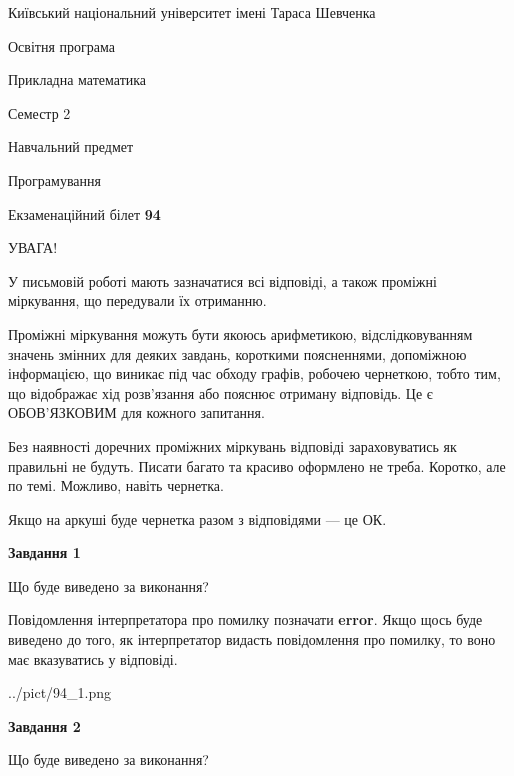 \documentclass[12pt, ukrainian]{article}
\begin{document}
{{\begin {small}\par
{ \center  Київський національний університет імені Тараса Шевченка \par}
{\parbox {5 cm}{Освітня програма \hfill}{\parbox {7 cm}{Прикладна математика \hfill}}\parbox {6 cm}{\hfill Семестр 2}}\par
{\parbox {5 cm} {Навчальний предмет \hfill}\parbox {7 cm}{Програмування \hfill}\parbox {6cm}{\hfill}\par}\vspace{-7pt} \end{small}}{\center Екзаменаційний білет \No \textbf
{ 94 }\par}}
{
\begin {large}
УВАГА!

У письмовій роботі мають зазначатися всі відповіді, а також проміжні міркування, що передували їх отриманню.

Проміжні міркування можуть бути якоюсь арифметикою, відслідковуванням зна\-чень змінних для деяких завдань,
короткими поясненнями, допоміжною інформацією, що виникає під час обходу графів, робочею чернеткою,
тобто тим, що відображає хід розв’язання або пояснює отриману відповідь.
Це є ОБОВ’ЯЗКОВИМ для кожного запитання.

Без наявності доречних проміжних міркувань відповіді зараховуватись як правиль\-ні не будуть.
Писати багато та красиво оформлено не треба. Коротко, але по темі. Можли\-во, навіть чернетка.

Якщо на аркуші буде чернетка разом з відповідями --- це ОК.

\newpage

{\begin {center}\textbf{Завдання 1}\end {center}}\par
Що буде виведено за виконання?

Повідомлення інтерпретатора про помилку позначати \textbf{error}.
Якщо щось буде виведено до того, як інтерпретатор видасть повідомлення про помилку, 
то воно має вказуватись у відповіді. \par


\begin{center}
	{../pict/94_1.png}
\end{center}
\newpage

{\begin {center}\textbf{Завдання 2}\end {center}}\par
Що буде виведено за виконання?


\end{large}}
\end{document}
